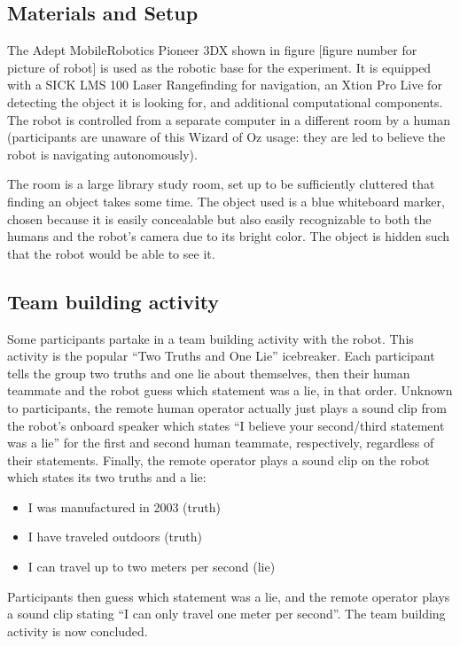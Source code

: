\documentclass{acm_proc_article-sp}
\begin{document}
\subsection{Materials and Setup}
The Adept MobileRobotics Pioneer 3DX shown in figure [figure number for picture of robot] is used as the robotic base for the experiment. It is equipped with a SICK LMS 100 Laser Rangefinding for navigation, an Xtion Pro Live for detecting the object it is looking for, and additional computational components. The robot is controlled from a separate computer in a different room by a human (participants are unaware of this Wizard of Oz usage: they are led to believe the robot is navigating autonomously).

The room is a large library study room, set up to be sufficiently cluttered that finding an object takes some time. The object used is a blue whiteboard marker, chosen because it is easily concealable but also easily recognizable to both the humans and the robot's camera due to its bright color. The object is hidden such that the robot would be able to see it.
\subsection{Team building activity}
\label{section:team-building-activity}
Some participants partake in a team building activity with the robot. This activity is the popular ``Two Truths and One Lie'' icebreaker. Each participant tells the group two truths and one lie about themselves, then their human teammate and the robot guess which statement was a lie, in that order. Unknown to participants, the remote human operator actually just plays a sound clip from the robot's onboard speaker which states ``I believe your second/third statement was a lie'' for the first and second human teammate, respectively, regardless of their statements. Finally, the remote operator plays a sound clip on the robot which states its two truths and a lie:
\begin{itemize}
 \item I was manufactured in 2003 (truth)
 \item I have traveled outdoors (truth)
 \item I can travel up to two meters per second (lie)
\end{itemize}
Participants then guess which statement was a lie, and the remote operator plays a sound clip stating ``I can only travel one meter per second''. The team building activity is now concluded.
\end{document}
